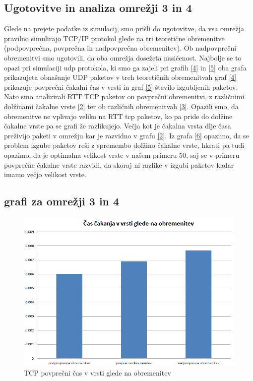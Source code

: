 \documentclass[11pt, a4paper, slovene]{book}
\begin{document}
\subsection{Ugotovitve in analiza omrežji 3 in 4}
Glede na prejete podatke iz simulacij, smo prišli do ugotovitve, da vsa omrežja pravilno simulirajo TCP/IP protokol glede na tri teoretične obremenitve (podpovprečna, povprečna in nadpovprečna obremenitev). 
Ob nadpovprečni obremenitvi smo ugotovili, da oba omrežja dosežeta nasičenost. Najbolje se to opazi pri simulaciji udp protokola, ki smo ga zajeli pri grafih \ref{4} in \ref{5} oba grafa prikazujeta obnašanje UDP paketov v treh teoretičnih obremenitvah graf \ref{4} prikazuje povprečni čakalni čas v vrsti in graf \ref{5} število izgubljenih paketov. Nato smo analizirali RTT TCP paketov on povprečni obremenitvi, z različnimi dolžinami čakalne vrste \ref{2} ter ob različnih obremenitvah \ref{3}. Opazili smo, da obremenitve ne vplivajo veliko na RTT tcp paketov, ko pa pride do dolžine čakalne vrste pa se grafi že razlikujejo. Večja kot je čakalna vrsta dlje časa preživijo paketi v omrežju kar je razvidno v grafu \ref{2}. Iz grafa \ref{6} opazimo, da se problem izgube paketov reši z spremembo dolžino čakalne vrste, hkrati pa tudi opazimo, da je optimalna velikost vrste v našem primeru 50, saj se v primeru povprečne čakalne vrste razvidi, da skoraj ni razlike v izgubi paketov kadar imamo večjo velikost vrste. 

\subsection{grafi za omrežji 3 in 4}

\begin{figure}[h]
	\centering
	\includegraphics[width=\textwidth]{TCP_cas_vrsta_obremenitev.png}
	\caption{TCP povprečni čas v vrsti glede na obremenitev}
	\label{1}	
\end{figure}
\end{document}
